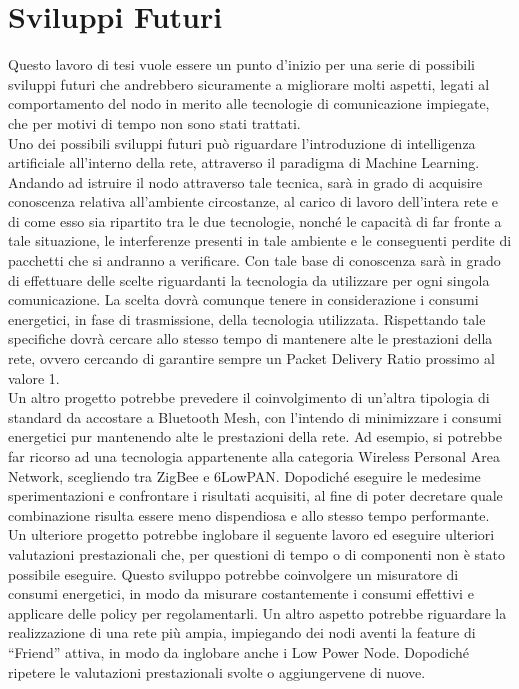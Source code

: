 \section{Sviluppi Futuri}
Questo lavoro di tesi vuole essere un punto d'inizio per una serie di possibili sviluppi futuri che andrebbero sicuramente a migliorare molti aspetti, legati al comportamento del nodo in merito alle tecnologie di comunicazione impiegate, che per motivi di tempo non sono stati trattati.\\
Uno dei possibili sviluppi futuri può riguardare l'introduzione di intelligenza artificiale all'interno della rete, attraverso il paradigma di Machine Learning. Andando ad istruire il nodo attraverso tale tecnica, sarà in grado di acquisire conoscenza relativa all'ambiente circostanze, al carico di lavoro dell'intera rete e di come esso sia ripartito tra le due tecnologie, nonché le capacità di far fronte a tale situazione, le interferenze presenti in tale ambiente e le conseguenti perdite di pacchetti che si andranno a verificare.
Con tale base di conoscenza sarà in grado di effettuare delle scelte riguardanti la tecnologia da utilizzare per ogni singola comunicazione.
La scelta dovrà comunque tenere in considerazione i consumi energetici, in fase di trasmissione, della tecnologia utilizzata. 
Rispettando tale specifiche dovrà cercare allo stesso tempo di mantenere alte le prestazioni della rete, ovvero cercando di garantire sempre un Packet Delivery Ratio prossimo al valore 1.\\
Un altro progetto potrebbe prevedere il coinvolgimento di un'altra tipologia di standard da accostare a Bluetooth Mesh, con l'intendo di minimizzare i consumi energetici pur mantenendo alte le prestazioni della rete. Ad esempio, si potrebbe far ricorso ad una tecnologia appartenente alla categoria Wireless Personal Area Network, scegliendo tra ZigBee e 6LowPAN. Dopodiché eseguire le medesime sperimentazioni e confrontare i risultati acquisiti, al fine di poter decretare quale combinazione risulta essere meno dispendiosa e allo stesso tempo performante.
Un ulteriore progetto potrebbe inglobare il seguente lavoro ed eseguire ulteriori valutazioni prestazionali che, per questioni di tempo o di componenti non è stato possibile eseguire. Questo sviluppo potrebbe coinvolgere un misuratore di consumi energetici, in modo da misurare costantemente i consumi effettivi e applicare delle policy per regolamentarli. Un altro aspetto potrebbe riguardare la realizzazione di una rete più ampia, impiegando dei nodi aventi la feature di ``Friend'' attiva, in modo da inglobare anche i Low Power Node. Dopodiché ripetere le valutazioni prestazionali svolte o aggiungervene di nuove.